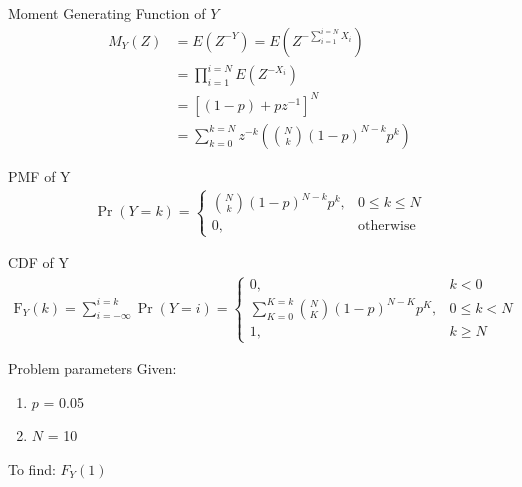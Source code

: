 \documentclass{beamer}
\providecommand{\pr}[1]{\ensuremath{\Pr\left(#1\right)}}
\providecommand{\cdf}[2]{\ensuremath{\text{F}_{#1}\left(#2\right)}}
\begin{document}
\begin{frame}
	\begin{exampleblock}{Moment Generating Function of $Y$}
		\begin{align}
			M_Y(Z) &= E(Z^{-Y}) = E(Z^{-\sum_{i = 1}^{i = N}X_i}) \\
			&= \prod_{i = 1}^{i = N}E(Z^{-X_i}) \\		
			&= [(1 - p) + pz^{-1}]^N \\
			&= \sum_{k = 0}^{k = N}z^{-k}(\binom{N}{k}(1 - p)^{N - k}p^k)
			\label{mgf-Y}		
		\end{align}
	\end{exampleblock}
	\begin{alertblock}{PMF of Y}
		\begin{align}
			\pr{Y = k} = 
			\begin{cases}
			\binom{N}{k}(1 - p)^{N - k}p^k, & 0 \leq k \leq N \\
			0, & \textrm{otherwise}
			\end{cases}
			\label{pmf-Y}		
		\end{align}
	\end{alertblock}
\end{frame}

\begin{frame}
	\begin{alertblock}{CDF of Y}
		\begin{align}
			\cdf{Y}{k} = \sum_{i = -\infty}^{i = k}\pr{Y = i} =
			\begin{cases}
			0, & k < 0 \\
			\sum_{K = 0}^{K = k}\binom{N}{K}(1 - p)^{N - K}p^K, & 0 \leq k < N \\
			1, & k \geq N
			\end{cases}
			\label{cdf-Y}		
		\end{align}
	\end{alertblock}
	\begin{alertblock}{Problem parameters}
		Given:
    		\begin{enumerate}
    			\item $p$ = 0.05
    			\item $N$ = 10
    		\end{enumerate}
		To find: $F_Y(1)$    
    \end{alertblock}
\end{frame}
\end{document}
